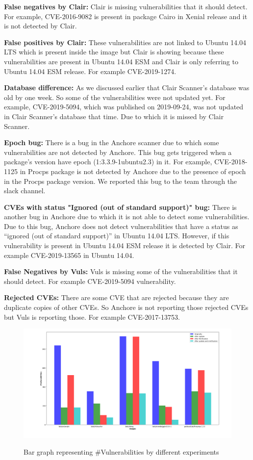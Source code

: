 \documentclass[a4paper,num-refs]{oup-contemporary}
\begin{document}
\textbf{False negatives by Clair:} Clair is missing vulnerabilities that it should detect. For example, CVE-2016-9082 
is present in package Cairo in Xenial release and it is not detected by Clair.

\textbf{False positives by Clair:} These vulnerabilities are not linked to Ubuntu 14.04 LTS which is 
present inside the image but Clair is showing because these vulnerabilities are present in Ubuntu 14.04 ESM and 
Clair is only referring to Ubuntu 14.04 ESM release. For example CVE-2019-1274.

\textbf{Database difference:} As we discussed earlier that Clair Scanner's database was old by one week.
                So some of the vulnerabilities were not updated yet. For example, CVE-2019-5094, which
		was published on 2019-09-24, was not 
		updated in Clair Scanner's database that time. Due to which it is missed by Clair Scanner.


\textbf{Epoch bug:} There is a bug in the Anchore scanner due to which some vulnerabilities are 
		not detected by Anchore. This bug gets triggered when a package’s version have epoch 
		(1:3.3.9-1ubuntu2.3) in it. For example, CVE-2018-1125 in Procps package is not
		detected by Anchore due to the presence of epoch in the Procps package version.
		We reported this bug to the team through the slack channel.

\textbf{CVEs with status "Ignored (out of standard support)" bug:} There is another bug in Anchore due to 
		which it is not able to detect some vulnerabilities. Due to this bug, Anchore does not detect 
		vulnerabilities that have a status as “ignored (out of standard support)” in Ubuntu 14.04 LTS. 
		However, if this vulnerability is present in Ubuntu 14.04 ESM release it is detected by Clair. 
		For example CVE-2019-13565 in Ubuntu 14.04.


\textbf{False Negatives by Vuls:} Vuls is missing some of the vulnerabilities that it should detect. 
		For example CVE-2019-5094 vulnerability.

\textbf{Rejected CVEs:} There are some CVE that are rejected because they are duplicate copies of other CVEs. 
	So Anchore is not reporting those rejected CVEs but Vuls is reporting those. For example CVE-2017-13753.

\begin{figure}[b]
        {\includegraphics[scale=1.5,width=\textwidth]
        {Figures/bargraph.png}}
        \caption{\label{fig:bargraph} Bar graph representing \#Vulnerabilities by different experiments}
      \end{figure}
\end{document}
